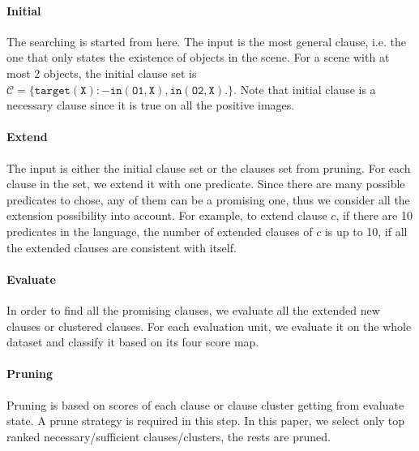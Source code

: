 \documentclass[
]{ceurart}
\begin{document}
	\paragraph{Initial}
	The searching is started from here. The input is the most general clause, i.e. the one that only states the existence of objects in the scene. For a scene with at most 2 objects, the initial clause set is $ \mathcal{C} = \{\mathtt{target(X):-in(O1,X),in(O2,X).} \} $. Note that initial clause is a necessary clause since it is true on all the positive images.
	
	\paragraph{Extend}
	The input is either the initial clause set or the clauses set from pruning. For each clause in the set, we extend it with one predicate. Since there are many possible predicates to chose, any of them can be a promising one, thus we consider all the extension possibility into account. For example, to extend clause $ c $, if there are 10 predicates in the language, the number of extended clauses of $ c $ is up to 10, if all the extended clauses are consistent with itself.
	
	\paragraph{Evaluate}
	In order to find all the promising clauses, we evaluate all the extended new clauses or clustered clauses. For each evaluation unit, we evaluate it on the whole dataset and classify it based on its four score map.
	
	\paragraph{Pruning}
	Pruning is based on scores of each clause or clause cluster getting from evaluate state. A prune strategy is required in this step. In this paper, we select only top ranked necessary/sufficient clauses/clusters, the rests are pruned. 
	
\end{document}
